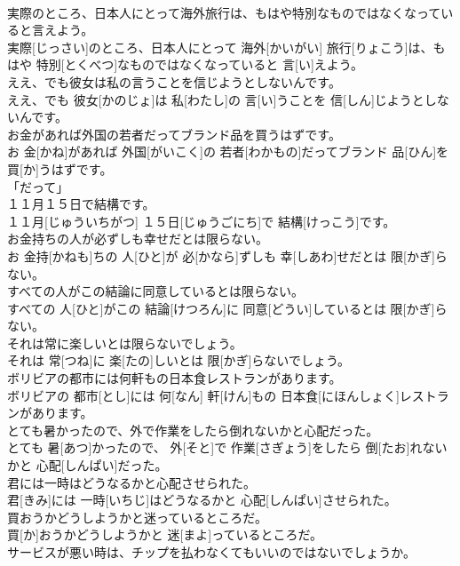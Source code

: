 \documentclass[8pt]{extreport}
\begin{document}
\begin{CJK}{UTF8}{min}
\\	実際のところ、日本人にとって海外旅行は、もはや特別なものではなくなっていると言えよう。	
\\	実際[じっさい]のところ、日本人にとって 海外[かいがい] 旅行[りょこう]は、もはや 特別[とくべつ]なものではなくなっていると 言[い]えよう。	
\\	ええ、でも彼女は私の言うことを信じようとしないんです。	
\\	ええ、でも 彼女[かのじょ]は 私[わたし]の 言[い]うことを 信[しん]じようとしないんです。	
\\	お金があれば外国の若者だってブランド品を買うはずです。	
\\	お 金[かね]があれば 外国[がいこく]の 若者[わかもの]だってブランド 品[ひん]を 買[か]うはずです。	
\\	「だって」
\\	１１月１５日で結構です。	
\\	１１月[じゅういちがつ] １５日[じゅうごにち]で 結構[けっこう]です。	
\\	お金持ちの人が必ずしも幸せだとは限らない。	
\\	お 金持[かねも]ちの 人[ひと]が 必[かなら]ずしも 幸[しあわ]せだとは 限[かぎ]らない。	
\\	すべての人がこの結論に同意しているとは限らない。	
\\	すべての 人[ひと]がこの 結論[けつろん]に 同意[どうい]しているとは 限[かぎ]らない。	
\\	それは常に楽しいとは限らないでしょう。	
\\	それは 常[つね]に 楽[たの]しいとは 限[かぎ]らないでしょう。	
\\	ボリビアの都市には何軒もの日本食レストランがあります。	
\\	ボリビアの 都市[とし]には 何[なん] 軒[けん]もの 日本食[にほんしょく]レストランがあります。	
\\	とても暑かったので、外で作業をしたら倒れないかと心配だった。	
\\	とても 暑[あつ]かったので、 外[そと]で 作業[さぎょう]をしたら 倒[たお]れないかと 心配[しんぱい]だった。	
\\	君には一時はどうなるかと心配させられた。	
\\	君[きみ]には 一時[いちじ]はどうなるかと 心配[しんぱい]させられた。	
\\	買おうかどうしようかと迷っているところだ。	
\\	買[か]おうかどうしようかと 迷[まよ]っているところだ。	
\\	サービスが悪い時は、チップを払わなくてもいいのではないでしょうか。	

\end{CJK}
\end{document}
